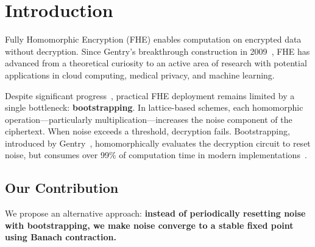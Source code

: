 \documentclass[11pt,a4paper]{article}
\begin{document}
\section{Introduction}

Fully Homomorphic Encryption (FHE) enables computation on encrypted data without decryption. Since Gentry's breakthrough construction in 2009~\cite{gentry09}, FHE has advanced from a theoretical curiosity to an active area of research with potential applications in cloud computing, medical privacy, and machine learning.

Despite significant progress~\cite{bgv14,bfv12,ckks17,tfhe20}, practical FHE deployment remains limited by a single bottleneck: \textbf{bootstrapping}. In lattice-based schemes, each homomorphic operation---particularly multiplication---increases the noise component of the ciphertext. When noise exceeds a threshold, decryption fails. Bootstrapping, introduced by Gentry~\cite{gentry09}, homomorphically evaluates the decryption circuit to reset noise, but consumes over 99\% of computation time in modern implementations~\cite{tfhe20}.

\subsection{Our Contribution}

We propose an alternative approach: \textbf{instead of periodically resetting noise with bootstrapping, we make noise converge to a stable fixed point using Banach contraction.}
\end{document}
